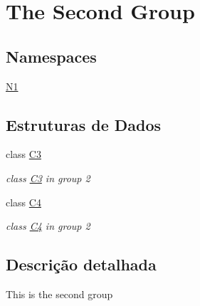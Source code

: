 \hypertarget{group__group2}{\section{The Second Group}
\label{group__group2}
}
\subsection*{Namespaces}
\begin{DoxyCompactItemize}
\item 
\hyperlink{namespace_n1}{N1}
\end{DoxyCompactItemize}
\subsection*{Estruturas de Dados}
\begin{DoxyCompactItemize}
\item 
class \hyperlink{class_c3}{C3}
\begin{DoxyCompactList}\small\item\em class \hyperlink{class_c3}{C3} in group 2 \end{DoxyCompactList}\item 
class \hyperlink{class_c4}{C4}
\begin{DoxyCompactList}\small\item\em class \hyperlink{class_c4}{C4} in group 2 \end{DoxyCompactList}\end{DoxyCompactItemize}


\subsection{Descrição detalhada}
This is the second group 